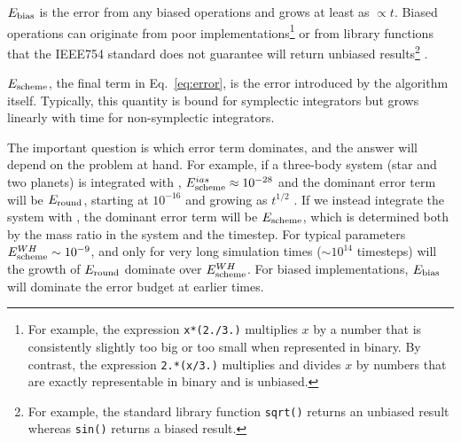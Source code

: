 $E_{\rm bias}$ is the error from any biased operations and grows at least as $\propto t$.
Biased operations can originate from poor implementations\footnote{For example, the expression \texttt{x*(2./3.)} multiplies $x$ by a number that is consistently slightly too big or too small when represented in binary.  By contrast, the expression \texttt{2.*(x/3.)} multiplies and divides $x$ by numbers that are exactly representable in binary and is unbiased.} or from library functions that the IEEE754 standard does not guarantee will return unbiased results\footnote{For example, the standard library function \texttt{sqrt()} returns an unbiased result whereas \texttt{sin()} returns a biased result.} .

$E_{\rm scheme}$, the final term in Eq.~\ref{eq:error}, is the error introduced by the algorithm itself. 
Typically, this quantity is bound for symplectic integrators but grows linearly with time for non-symplectic integrators.

The important question is which error term dominates, and the answer will depend on the problem at hand.
For example, if a three-body system (star and two planets) is integrated with \ias, $E_{\rm scheme}^{ias} \approx 10^{-28}$ and the dominant error term will be $E_{\rm round}$, starting at $10^{-16}$ and growing as $t^{1/2}$ \citep[see][]{Rein2015a}. 
If we instead integrate the system with \whfast, the dominant error term will be $E_{\rm scheme}$, which is determined both by the mass ratio in the system and the timestep. 
For typical parameters $E^{WH}_{\rm scheme} \sim 10^{-9}$, and only for very long simulation times ($\sim 10^{14}$ timesteps) will the growth of $E_{\rm round}$ dominate over $E^{WH}_{\rm scheme}$.
For biased implementations, $E_{\rm bias}$ will dominate the error budget at earlier times.  


